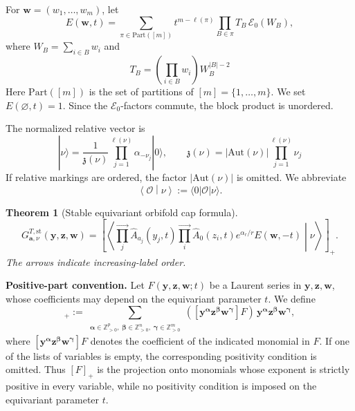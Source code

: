 \documentclass[letterpaper,12pt]{amsart}
\newtheorem{thm}{Theorem}[section]
\theoremstyle{definition}
\newcommand{\Ecal}{\mathcal E}
\newcommand{\Aut}{\mathrm{Aut}}
\newcommand{\Part}{\mathrm{Part}}
\numberwithin{equation}{section}
\begin{document}
For \(\mathbf w=(w_1,\ldots,w_m)\), let
\[
  E(\mathbf w,t)
  =
  \sum_{\pi\in\Part([m])}t^{m-\ell(\pi)}
  \prod_{B\in\pi}T_B\,\Ecal_0(W_B),
\]
where \(W_B=\sum_{i\in B}w_i\) and
\begin{equation*}
T_B=\left(\prod_{i\in B}w_i\right)W_B^{|B|-2}    
\end{equation*}
Here \(\Part([m])\) is the set of partitions of
\([m]=\{1,\ldots,m\}\). We set
\(E(\varnothing,t)=1\). Since the \(\Ecal_0\)-factors commute, the block
product is unordered. 

The normalized relative vector is
\begin{equation}\label{eq:relative-ket}
 |\nu\rangle
 =\frac{1}{\mathfrak z(\nu)}
  \prod_{j=1}^{\ell(\nu)}\alpha_{-\nu_j}|0\rangle,
 \qquad
 \mathfrak z(\nu)=|\Aut(\nu)|\prod_{j=1}^{\ell(\nu)}\nu_j
\end{equation}
If relative markings are ordered, the factor
\(|\Aut(\nu)|\) is omitted. We abbreviate
\[
  \left\langle\mathcal O\middle|\nu\right\rangle
  :=
  \langle0|\mathcal O|\nu\rangle.
\]

\begin{thm}[Stable equivariant orbifold cap formula]\label{thm:eq-cap}
\begin{equation}\label{eq:eq-cap-formula}
  G^{T,\mathrm{st}}_{\mathbf a,\nu}(\mathbf y,\mathbf z,\mathbf w)
  =
  \left[
    \left\langle
      \overrightarrow{\prod_j}\widehat A_{a_j}(y_j,t)
      \overrightarrow{\prod_i}\widehat A_0(z_i,t)
      e^{\alpha_r/r}
      E(\mathbf w,-t)
    \middle|\nu\right\rangle
  \right]_{+}.
\end{equation}
The arrows indicate increasing-label order. 
\end{thm}

\medskip
\noindent\textbf{Positive-part convention.}
Let \(F(\mathbf y,\mathbf z,\mathbf w;t)\) be a Laurent series in
\(\mathbf y,\mathbf z,\mathbf w\), whose coefficients may depend on the
equivariant parameter \(t\).  We define
\begin{equation*}
[F]_+
:=
\sum_{\substack{
\boldsymbol\alpha\in\mathbb Z_{>0}^{p},\;
\boldsymbol\beta\in\mathbb Z_{>0}^{n},\;
\boldsymbol\gamma\in\mathbb Z_{>0}^{m}}}
([\mathbf y^{\boldsymbol\alpha}
 \mathbf z^{\boldsymbol\beta}
 \mathbf w^{\boldsymbol\gamma}]F)\,
\mathbf y^{\boldsymbol\alpha}
\mathbf z^{\boldsymbol\beta}
\mathbf w^{\boldsymbol\gamma},
\end{equation*}
where
\(
[\mathbf y^{\boldsymbol\alpha}
 \mathbf z^{\boldsymbol\beta}
 \mathbf w^{\boldsymbol\gamma}]F
\)
denotes the coefficient of the indicated monomial in \(F\). If one of the lists of variables is empty, the corresponding positivity
condition is omitted. Thus \([F]_+\) is the projection onto monomials whose exponent is strictly positive in every variable, while no positivity condition is imposed on the equivariant parameter \(t\).
\end{document}
